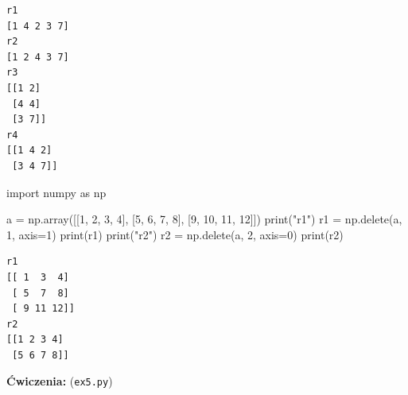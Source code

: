 \documentclass[
  polish,
  letterpaper,
  DIV=11,
  numbers=noendperiod]{scrreprt}
\newenvironment{Shaded}{\begin{snugshade}}{\end{snugshade}}
\newcommand{\BuiltInTok}[1]{\textcolor[rgb]{0.00,0.23,0.31}{#1}}
\newcommand{\DecValTok}[1]{\textcolor[rgb]{0.68,0.00,0.00}{#1}}
\newcommand{\ImportTok}[1]{\textcolor[rgb]{0.00,0.46,0.62}{#1}}
\newcommand{\NormalTok}[1]{\textcolor[rgb]{0.00,0.23,0.31}{#1}}
\newcommand{\OperatorTok}[1]{\textcolor[rgb]{0.37,0.37,0.37}{#1}}
\newcommand{\StringTok}[1]{\textcolor[rgb]{0.13,0.47,0.30}{#1}}
\begin{document}
\begin{verbatim}
r1
[1 4 2 3 7]
r2
[1 2 4 3 7]
r3
[[1 2]
 [4 4]
 [3 7]]
r4
[[1 4 2]
 [3 4 7]]
\end{verbatim}

\begin{Shaded}
\begin{Highlighting}[]
\ImportTok{import}\NormalTok{ numpy }\ImportTok{as}\NormalTok{ np}

\NormalTok{a }\OperatorTok{=}\NormalTok{ np.array([[}\DecValTok{1}\NormalTok{, }\DecValTok{2}\NormalTok{, }\DecValTok{3}\NormalTok{, }\DecValTok{4}\NormalTok{], [}\DecValTok{5}\NormalTok{, }\DecValTok{6}\NormalTok{, }\DecValTok{7}\NormalTok{, }\DecValTok{8}\NormalTok{], [}\DecValTok{9}\NormalTok{, }\DecValTok{10}\NormalTok{, }\DecValTok{11}\NormalTok{, }\DecValTok{12}\NormalTok{]])}
\BuiltInTok{print}\NormalTok{(}\StringTok{"r1"}\NormalTok{)}
\NormalTok{r1 }\OperatorTok{=}\NormalTok{ np.delete(a, }\DecValTok{1}\NormalTok{, axis}\OperatorTok{=}\DecValTok{1}\NormalTok{)}
\BuiltInTok{print}\NormalTok{(r1)}
\BuiltInTok{print}\NormalTok{(}\StringTok{"r2"}\NormalTok{)}
\NormalTok{r2 }\OperatorTok{=}\NormalTok{ np.delete(a, }\DecValTok{2}\NormalTok{, axis}\OperatorTok{=}\DecValTok{0}\NormalTok{)}
\BuiltInTok{print}\NormalTok{(r2)}
\end{Highlighting}
\end{Shaded}

\begin{verbatim}
r1
[[ 1  3  4]
 [ 5  7  8]
 [ 9 11 12]]
r2
[[1 2 3 4]
 [5 6 7 8]]
\end{verbatim}

\textbf{Ćwiczenia:} (\texttt{ex5.py})
\end{document}
